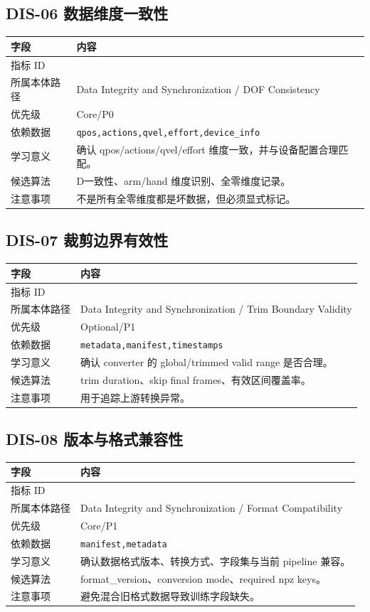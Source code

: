 \documentclass[UTF8,zihao=-4,oneside,openany]{ctexrep}
\newcommand{\Code}[1]{\texttt{#1}}
\newcommand{\MID}[1]{\texttt{\seqsplit{#1}}}
\begin{document}
\subsection{DIS-06 数据维度一致性}

\begin{longtable}{L{3.6cm} L{9.6cm}}
\toprule
字段 & 内容 \\
\midrule
指标 ID & \MID{DIS-06} \\
所属本体路径 & Data Integrity and Synchronization / DOF Consistency \\
优先级 & Core/P0 \\
依赖数据 & \Code{qpos,actions,qvel,effort,device\_info} \\
学习意义 & 确认 qpos/actions/qvel/effort 维度一致，并与设备配置合理匹配。 \\
候选算法 & D一致性、arm/hand 维度识别、全零维度记录。 \\
注意事项 & 不是所有全零维度都是坏数据，但必须显式标记。 \\
\bottomrule
\end{longtable}

\subsection{DIS-07 裁剪边界有效性}

\begin{longtable}{L{3.6cm} L{9.6cm}}
\toprule
字段 & 内容 \\
\midrule
指标 ID & \MID{DIS-07} \\
所属本体路径 & Data Integrity and Synchronization / Trim Boundary Validity \\
优先级 & Optional/P1 \\
依赖数据 & \Code{metadata,manifest,timestamps} \\
学习意义 & 确认 converter 的 global/trimmed valid range 是否合理。 \\
候选算法 & trim duration、skip final frames、有效区间覆盖率。 \\
注意事项 & 用于追踪上游转换异常。 \\
\bottomrule
\end{longtable}

\subsection{DIS-08 版本与格式兼容性}

\begin{longtable}{L{3.6cm} L{9.6cm}}
\toprule
字段 & 内容 \\
\midrule
指标 ID & \MID{DIS-08} \\
所属本体路径 & Data Integrity and Synchronization / Format Compatibility \\
优先级 & Core/P1 \\
依赖数据 & \Code{manifest,metadata} \\
学习意义 & 确认数据格式版本、转换方式、字段集与当前 pipeline 兼容。 \\
候选算法 & format\_version、conversion mode、required npz keys。 \\
注意事项 & 避免混合旧格式数据导致训练字段缺失。 \\
\bottomrule
\end{longtable}
\end{document}
